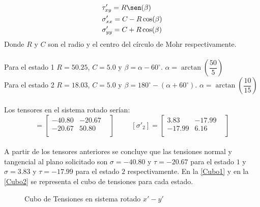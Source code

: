 \documentclass[../notas medios.tex]{subfiles}
\begin{document}
\begin{enumerate}
%
\begin {equation}
\begin {aligned}
 &\tau'_{xy} = R  \sen (\beta) \\
 &\sigma'_{xx} = C - R  \cos(\beta) \\
 &\sigma'_{yy} = C + R  \cos(\beta) \\
\end {aligned}
\label{cicmohr1}
\end {equation}
%
Donde $R$ y $C$ son el radio  y el centro del círculo de Mohr
respectivamente.\\\\
%
Para el estado 1 $R = 50.25$, $C = 5.0$ y $\beta =\alpha - 60 ^{\circ}$. $\alpha
= \arctan\left(\dfrac{50}{5}\right)$ \\
%
Para el estado 2 $R = 18.03 $, $C = 5.0$ y $\beta =180^{\circ} - (\alpha +
60^{\circ})$. $\alpha = \arctan\left(\dfrac{10}{15}\right)$ \\\\
%
Los tensores en el sistema rotado serían: \\
 \begin{equation*}
[\sigma'_1] =
 	\begin{bmatrix}
     	-40.80 & -20.67 & \\
     	-20.67 & 50.80 \\
 	\end{bmatrix}
 \hspace{1cm}
 [\sigma'_2] =
 	\begin{bmatrix}
     	3.83 & -17.99 & \\
     	-17.99 & 6.16 \\
 	\end{bmatrix}
\end{equation*} \\
A partir de los tensores anteriores se concluye que las tensiones normal y tangencial
al plano solicitado son $\sigma=-40.80$ y  $\tau = -20.67$ para el estado $1$ y
$\sigma=3.83$ y  $\tau = -17.99$ para el estado $2$ respectivamente. En la
\cref{Cubo1} y en la \cref{Cubo2} se representa el cubo de tensiones para cada estado.
%

\begin{figure}[H]
	\centering
		\hspace{0.5cm}
	\caption{Cubo de Tensiones en sistema rotado $x'-y'$ }
	\label{Cubos}
\end{figure}


\end{enumerate}
\end{document}

